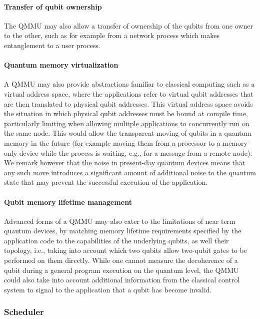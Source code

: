 \paragraph{Transfer of qubit ownership}

The \ac{QMMU} may also allow a transfer of ownership of the qubits from one owner to the other, such as for example from a network process which makes entanglement to a user process. 

\paragraph{Quantum memory virtualization}

A \ac{QMMU} may also provide abstractions familiar to classical computing such as a virtual address space, where the applications refer to virtual qubit addresses that are then translated to physical qubit addresses. This virtual address space avoids the situation in which physical qubit addresses must be bound at compile time, particularly limiting when allowing multiple applications to concurrently run on the same node. This would allow the transparent moving of qubits in a quantum memory in the future (for example moving them from a processor to a memory-only device while the process is waiting, e.g., for a message from a remote node). We remark however that the noise in present-day quantum devices means that any such move introduces a significant amount of additional noise to the quantum state that may prevent the successful execution of the application.

\paragraph{Qubit memory lifetime management}

Advanced forms of a \ac{QMMU} may also cater to the limitations of near term quantum devices, by matching memory lifetime requirements specified by the application code to the capabilities of the underlying qubits, as well their topology, i.e., taking into account which two qubits allow two-qubit gates to be performed on them directly. While one cannot measure the decoherence of a qubit during a general program execution on the quantum level, the \ac{QMMU} could also take into account additional information from the classical control system to signal to the application that a qubit has become invalid.

\subsubsection{Scheduler}

